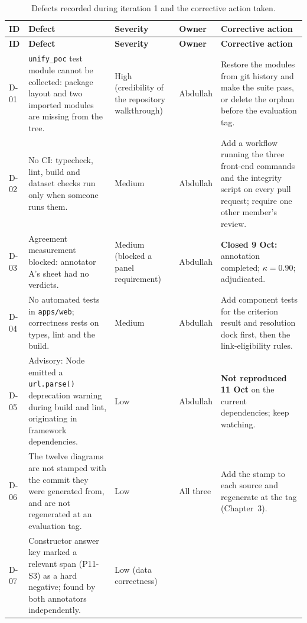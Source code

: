\begin{longtable}{>{\raggedright\arraybackslash}p{} >{\raggedright\arraybackslash}p{} >{\raggedright\arraybackslash}p{} >{\raggedright\arraybackslash}p{} >{\raggedright\arraybackslash}p{}}
\caption{Defects recorded during iteration 1 and the corrective action taken.}\label{tab:defects}\\
\hline\textbf{ID} & \textbf{Defect} & \textbf{Severity} & \textbf{Owner} &
  \textbf{Corrective action} \\
\hline\endfirsthead
\hline\textbf{ID} & \textbf{Defect} & \textbf{Severity} & \textbf{Owner} &
  \textbf{Corrective action} \\
\hline\endhead
D-01 & \texttt{unify\_poc} test module cannot be collected: package layout and
  two imported modules are missing from the tree. & High (credibility of the
  repository walkthrough) & Abdullah & Restore the modules from git history and
  make the suite pass, or delete the orphan before the evaluation tag. \\
D-02 & No CI: typecheck, lint, build and dataset checks run only when someone
  runs them. & Medium & Abdullah & Add a workflow running the three front-end
  commands and the integrity script on every pull request; require one other
  member's review. \\
D-03 & Agreement measurement blocked: annotator A's sheet had no verdicts. &
  Medium (blocked a panel requirement) & Abdullah & \textbf{Closed 9 Oct:}
  annotation completed; $\kappa = 0.90$; adjudicated. \\
D-04 & No automated tests in \texttt{apps/web}; correctness rests on types, lint
  and the build. & Medium & Abdullah & Add component tests for the criterion
  result and resolution dock first, then the link-eligibility rules. \\
D-05 & Advisory: Node emitted a \texttt{url.parse()} deprecation warning during
  build and lint, originating in framework dependencies. & Low & Abdullah &
  \textbf{Not reproduced 11 Oct} on the current dependencies; keep watching. \\
D-06 & The twelve diagrams are not stamped with the commit they were generated
  from, and are not regenerated at an evaluation tag. & Low & All three &
  Add the stamp to each source and regenerate at the tag (Chapter~3). \\
D-07 & Constructor answer key marked a relevant span (P11-S3) as a hard
  negative; found by both annotators independently. & Low (data correctness) &

\end{longtable}
